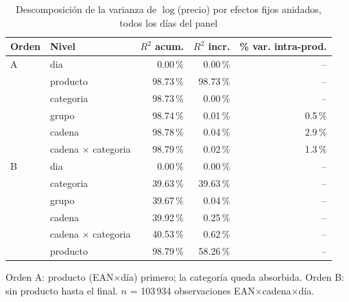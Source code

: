 \begin{table}[htbp]
\caption{Descomposici\'on de la varianza de $\log$(precio) por efectos fijos anidados, todos los d\'ias del panel}
\label{tab:varianza}
\centering\scriptsize\setlength{\tabcolsep}{3pt}
\begin{tabular}{@{}llrrr@{}}
\toprule
Orden & Nivel & $R^2$ acum. & $R^2$ incr. & \% var. intra-prod. \\
\midrule
A & dia & 0.00\,\% & 0.00\,\% & -- \\
 & producto & 98.73\,\% & 98.73\,\% & -- \\
 & categoria & 98.73\,\% & 0.00\,\% & -- \\
 & grupo & 98.74\,\% & 0.01\,\% & 0.5\,\% \\
 & cadena & 98.78\,\% & 0.04\,\% & 2.9\,\% \\
 & cadena $\times$ categoria & 98.79\,\% & 0.02\,\% & 1.3\,\% \\
\midrule
B & dia & 0.00\,\% & 0.00\,\% & -- \\
 & categoria & 39.63\,\% & 39.63\,\% & -- \\
 & grupo & 39.67\,\% & 0.04\,\% & -- \\
 & cadena & 39.92\,\% & 0.25\,\% & -- \\
 & cadena $\times$ categoria & 40.53\,\% & 0.62\,\% & -- \\
 & producto & 98.79\,\% & 58.26\,\% & -- \\
\bottomrule\end{tabular}
\par\smallskip\raggedright\scriptsize Orden A: producto (EAN$\times$d\'ia) primero; la categor\'ia queda absorbida. Orden B: sin producto hasta el final. $n$ = 103\,934 observaciones EAN$\times$cadena$\times$d\'ia.
\end{table}

